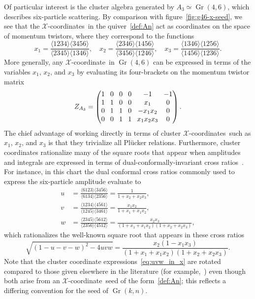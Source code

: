\documentclass[12pt]{article}
\DeclareMathOperator{\Gr}{Gr}
\def\ket#1{\langle #1 \rangle}
\def\xcoord{$\mathcal{X}$-coordinate}
\def\xcoords{$\mathcal{X}$-coordinates}
\begin{document}
Of particular interest is the cluster algebra generated by $A_3 \simeq \Gr(4,6)$, which describes six-particle scattering. By comparison with figure~\ref{fig:g46-x-seed}, we see that the \xcoords\ in the quiver~\eqref{def:An} act as coordinates on the space of momentum twistors, where they correspond to the functions
\begin{equation}\label{eq:a3-seed-def}
x_1 = \frac{\ket{1234}\ket{3456}}{\ket{2345}\ket{1346}}, \quad x_2 = \frac{\ket{2346}\ket{1456}}{\ket{3456}\ket{1246}}, \quad x_3 = \frac{\ket{1346}\ket{1256}}{\ket{1456}\ket{1236}}.
\end{equation}
More generally, any \xcoord\ in $\Gr(4,6)$ can be expressed in terms of the variables $x_1$, $x_2$, and $x_3$ by evaluating its four-brackets on the momentum twistor matrix
\begin{equation} \label{eq:a3_momentum_twistor_matrix}
Z_{A_3} = 
\begingroup
\setlength\arraycolsep{4pt}
\begin{pmatrix} 
1 & 0 & 0 & 0 & -1 & -1 \\
1 & 1 & 0 & 0 & x_1 & 0 \\
0 & 1 & 1 & 0 & -x_1 x_2 & 0 \\
0 & 0 & 1 & 1 & x_1 x_2 x_3 & 0
\end{pmatrix}
\endgroup .
\end{equation}
The chief advantage of working directly in terms of cluster \xcoords\ such as $x_1$, $x_2$, and $x_3$ is that they trivialize all Pl\"ucker relations. Furthermore, cluster coordinates rationalize many of the square roots that appear when amplitudes and integrals are expressed in terms of dual-conformally-invariant cross ratios~\cite{Bourjaily:2018aeq}. For instance, in this chart the dual conformal cross ratios commonly used to express the six-particle amplitude evaluate to
\begin{align} \label{eq:uvw_in_x}
u &= \frac{\ket{6123}\ket{3456}}{\ket{6134}\ket{2356}} = \frac{1}{1+x_2+x_2 x_3}, \\ 
v &= \frac{\ket{1234} \ket{4561}}{\ket{1245}\ket{3461}} =\frac{x_1 x_2}{1+x_1+x_1 x_2}, \\ 
w &= \frac{\ket{2345} \ket{5612}}{\ket{2356}\ket{4512}} =\frac{x_2 x_3}{(1+x_1+x_1 x_2)(1+x_2+x_2 x_3)},
\end{align}
which rationalizes the well-known square root that appears in these cross ratios 
\begin{equation}
\sqrt{(1 - u - v - w)^2 - 4 u v w} = \frac{x_2 \left(1-x_1 x_3\right)}{\left(1+x_1+x_1
   x_2\right) \left(1+x_2+x_2 x_3\right)} .
\end{equation}
Note that the cluster coordinate expressions~\eqref{eq:uvw_in_x} are rotated compared to those given elsewhere in the literature (for example,~\cite{Golden:2013xva,Parker:2015cia}) even though both arise from an \xcoord\ seed of the form~\eqref{def:An}; this reflects a differing convention for the seed of $\Gr(k,n)$.
\end{document}
